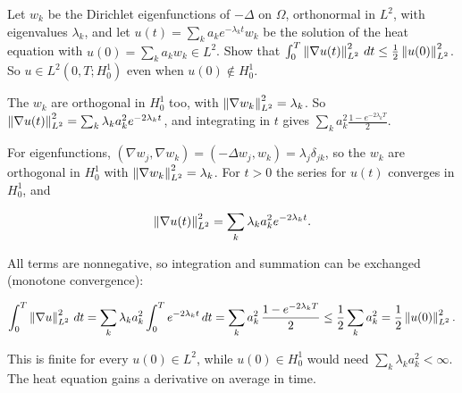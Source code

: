 \begin{exercise}
  Let $w_k$ be the Dirichlet eigenfunctions of $-\Delta$ on $\Omega$, orthonormal in $L^2$, with eigenvalues $\lambda_k$, and let $u(t) = \sum_k a_k e^{-\lambda_k t} w_k$ be the solution of the heat equation with $u(0) = \sum_k a_k w_k \in L^2$. Show that $\int_0^T \left\lVert \nabla u(t)\right\rVert_{L^2}^2\,dt \le \frac12\left\lVert u(0)\right\rVert_{L^2}^2$. So $u \in L^2(0,T;H^1_0)$ even when $u(0) \notin H^1_0$.
  \begin{hint}
    The $w_k$ are orthogonal in $H^1_0$ too, with $\left\lVert \nabla w_k\right\rVert_{L^2}^2 = \lambda_k$. So $\left\lVert \nabla u(t)\right\rVert_{L^2}^2 = \sum_k \lambda_k a_k^2 e^{-2\lambda_k t}$, and integrating in $t$ gives $\sum_k a_k^2 \frac{1 - e^{-2\lambda_k T}}{2}$.
  \end{hint}
  \begin{solution}
    For eigenfunctions, $(\nabla w_j, \nabla w_k) = (-\Delta w_j, w_k) = \lambda_j\delta_{jk}$, so the $w_k$ are orthogonal in $H^1_0$ with $\left\lVert \nabla w_k\right\rVert_{L^2}^2 = \lambda_k$. For $t > 0$ the series for $u(t)$ converges in $H^1_0$, and

    \[ \left\lVert \nabla u(t)\right\rVert_{L^2}^2 = \sum_k \lambda_k a_k^2 e^{-2\lambda_k t}. \]

    All terms are nonnegative, so integration and summation can be exchanged (monotone convergence):

    \[ \int_0^T \left\lVert \nabla u\right\rVert_{L^2}^2\,dt = \sum_k \lambda_k a_k^2\int_0^T e^{-2\lambda_kt}\,dt = \sum_k a_k^2\,\frac{1 - e^{-2\lambda_kT}}{2}
             \le \frac12\sum_k a_k^2 = \frac12\left\lVert u(0)\right\rVert_{L^2}^2. \]

    This is finite for every $u(0) \in L^2$, while $u(0) \in H^1_0$ would need $\sum_k\lambda_k a_k^2 < \infty$. The heat equation gains a derivative on average in time.
  \end{solution}
\end{exercise}

